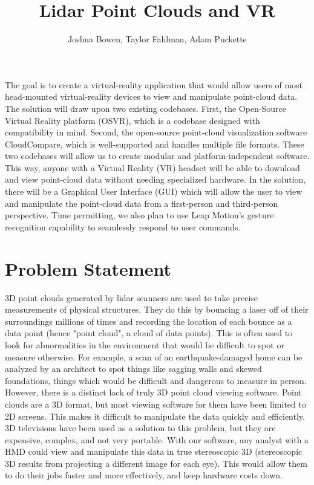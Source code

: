 \documentclass{article}
\begin{document}
\title{Lidar Point Clouds and VR}
\author{Joshua Bowen, Taylor Fahlman, Adam Puckette}

\maketitle

\abstract

The goal is to create a virtual-reality application that would allow users of most head-mounted virtual-reality devices to view and manipulate point-cloud data. The solution will draw upon two existing codebases. First, the Open-Source Virtual Reality platform (OSVR), which is a codebase designed with compatibility in mind. Second, the open-source point-cloud visualization software CloudCompare, which is well-supported and handles multiple file formats. These two codebases will allow us to create modular and platform-independent software. This way, anyone with a Virtual Reality (VR) headset will be able to download and view point-cloud data without needing specialized hardware. In the solution, there will be a Graphical User Interface (GUI) which will allow the user to view and manipulate the point-cloud data from a first-person and third-person perspective. Time permitting, we also plan to use Leap Motion's gesture recognition capability to seamlessly respond to user commands.

\vfill
\section*{Problem Statement}

3D point clouds generated by lidar scanners are used to take precise measurements of physical structures. They do this by bouncing a laser off of their surroundings millions of times and recording the location of each bounce as a data point (hence "point cloud", a cloud of data points). This is often used to look for abnormalities in the environment that would be difficult to spot or measure otherwise. For example, a scan of an earthquake-damaged home can be analyzed by an architect to spot things like sagging walls and skewed foundations, things which would be difficult and dangerous to measure in person. However, there is a distinct lack of truly 3D point cloud viewing software. Point clouds are a 3D format, but most viewing software for them have been limited to 2D screens. This makes it difficult to manipulate the data quickly and efficiently. 3D televisions have been used as a solution to this problem, but they are expensive, complex, and not very portable. With our software, any analyst with a HMD could view and manipulate this data in true stereoscopic 3D (stereoscopic 3D results from projecting a different image for each eye). This would allow them to do their jobs faster and more effectively, and keep hardware costs down. 
\end{document}

